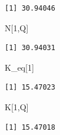 \documentclass[
  letterpaper,
  DIV=11,
  numbers=noendperiod]{scrreprt}
\newenvironment{Shaded}{\begin{snugshade}}{\end{snugshade}}
\newcommand{\DecValTok}[1]{\textcolor[rgb]{0.68,0.00,0.00}{#1}}
\newcommand{\NormalTok}[1]{\textcolor[rgb]{0.00,0.23,0.31}{#1}}
\begin{document}
\begin{verbatim}
[1] 30.94046
\end{verbatim}

\begin{Shaded}
\begin{Highlighting}[]
\NormalTok{N[}\DecValTok{1}\NormalTok{,Q]}
\end{Highlighting}
\end{Shaded}

\begin{verbatim}
[1] 30.94031
\end{verbatim}

\begin{Shaded}
\begin{Highlighting}[]
\NormalTok{K\_eq[}\DecValTok{1}\NormalTok{]}
\end{Highlighting}
\end{Shaded}

\begin{verbatim}
[1] 15.47023
\end{verbatim}

\begin{Shaded}
\begin{Highlighting}[]
\NormalTok{K[}\DecValTok{1}\NormalTok{,Q]}
\end{Highlighting}
\end{Shaded}

\begin{verbatim}
[1] 15.47018
\end{verbatim}
\end{document}
